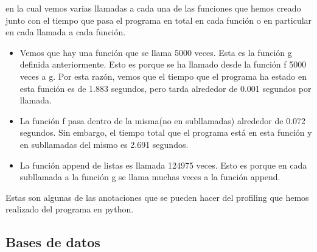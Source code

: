 \begin{itemize}
		en la cual vemos varias llamadas a cada una de las funciones que hemos creado junto con el tiempo que pasa el programa en total en cada función o en particular en cada llamada a cada función.\\
		
		\begin{itemize}
			\item Vemos que hay una función que se llama 5000 veces. Esta es la función g definida anteriormente. Esto es porque se ha llamado desde la función f 5000 veces a g. Por esta razón, vemos que el tiempo que el programa ha estado en esta función es de 1.883 segundos, pero tarda alrededor de 0.001 segundos por llamada.\\
			
			\item La función f pasa dentro de la misma(no en subllamadas) alrededor de 0.072 segundos. Sin embargo, el tiempo total que el programa está en esta función y en subllamadas del mismo es 2.691 segundos.\\
			
			\item La función append de listas es llamada 124975 veces. Esto es porque en cada subllamada a la función g se llama muchas veces a la función append.
		\end{itemize}
		
		Estas son algunas de las anotaciones que se pueden hacer del profiling que hemos realizado del programa en python.

	\end{itemize}

\subsection{Bases de datos}

